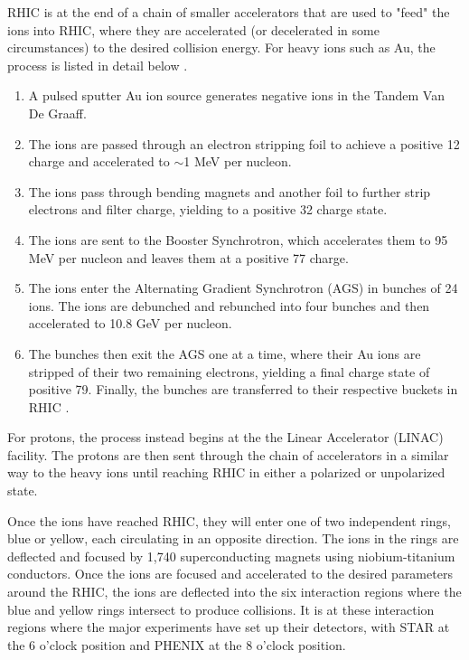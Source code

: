 RHIC is at the end of a chain of smaller accelerators that are used to "feed" the ions into RHIC, where they are accelerated (or decelerated in some circumstances) to the desired collision energy. For heavy ions such as Au, the process is listed in detail below \cite{ROSER200223}.
\begin{enumerate}
  \item{} A pulsed sputter Au ion source generates negative ions in the Tandem Van De Graaff.
  \item{} The ions are passed through an electron stripping foil to achieve a positive 12 charge and accelerated to $\sim$1 MeV per nucleon.
  \item{} The ions pass through bending magnets and another foil to further strip electrons and filter charge, yielding to a positive 32 charge state.
  \item{} The ions are sent to the Booster Synchrotron, which accelerates them to 95 MeV per nucleon and leaves them at a positive 77 charge.
  \item{} The ions enter the Alternating Gradient Synchrotron (AGS) in bunches of 24 ions. The ions are debunched and rebunched into four bunches and then accelerated to 10.8 GeV per nucleon.
  \item{}  The bunches then exit the AGS one at a time, where their Au ions are stripped of their two remaining electrons, yielding a final charge state of positive 79. Finally, the bunches are transferred to their respective buckets in RHIC . 
\end{enumerate}

For protons, the process instead begins at the the Linear Accelerator (LINAC) facility. The protons are then sent through the chain of accelerators in a similar way to the heavy ions until reaching RHIC in either a polarized or unpolarized state. 

Once the ions have reached RHIC, they will enter one of two independent rings, blue or yellow, each circulating in an opposite direction. The ions in the rings are deflected and focused by 1,740 superconducting magnets using niobium-titanium conductors. Once the ions are focused and accelerated to the desired parameters around the RHIC, the ions are deflected into the six interaction regions where the blue and yellow rings intersect to produce collisions. It is at these interaction regions where the major experiments have set up their detectors, with STAR at the 6 o'clock position and PHENIX at the 8 o'clock position.

